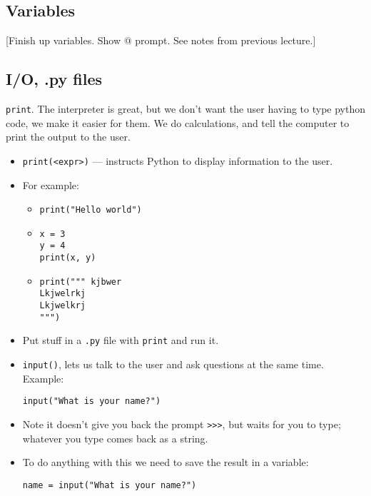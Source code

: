 \documentclass{article}
\begin{document}
\subsection*{Variables}

[Finish up variables.  Show @ prompt.  See notes from previous
lecture.]

\subsection*{I/O, .py files}

\verb|print|.  The interpreter is great, but we don’t want the user
having to type python code, we make it easier for them.  We do
calculations, and tell the computer to print the output to the user.

\begin{itemize}
\item \verb|print(<expr>)| --- instructs Python to display information
  to the user.
\item For example:
  \begin{itemize}
  \item \verb|print("Hello world")|
  \item
\begin{verbatim}
x = 3
y = 4
print(x, y)
\end{verbatim}
  \item
\begin{verbatim}
print(""" kjbwer
Lkjwelrkj
Lkjwelkrj
""")
\end{verbatim}
  \end{itemize}

\item Put stuff in a \verb|.py| file with \verb|print| and run it.

\item \verb|input()|, lets us talk to the user and ask questions
  at the same time.  Example:
\begin{verbatim}
input("What is your name?")
\end{verbatim}
\item Note it doesn't give you back the prompt \verb|>>>|, but waits
  for you to type; whatever you type comes back as a string.

\item  To do anything with this we need to save the result in a variable:
\begin{verbatim}
name = input("What is your name?")
\end{verbatim}


\end{itemize}
\end{document}
